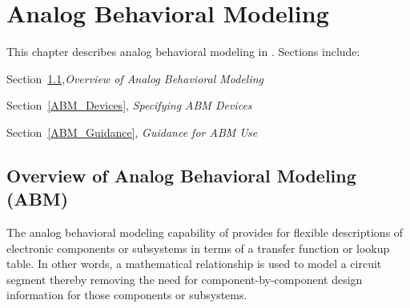 


\chapter{Analog Behavioral Modeling}
\label{Behavioral_Modeling}

{
This chapter describes analog behavioral
modeling in \Xyce{}.  Sections include:
\begin{XyceItemize}
\item Section~\ref{Behavioral_Overview},{\em Overview of Analog Behavioral Modeling}
\item Section~\ref{ABM_Devices}, {\em Specifying ABM Devices}
\item Section~\ref{ABM_Guidance}, {\em Guidance for ABM Use}
\end{XyceItemize}
}

\section{Overview of Analog Behavioral Modeling (ABM)}
\label{Behavioral_Overview}

The analog behavioral modeling
capability of \Xyce{} provides for flexible descriptions of
electronic components or subsystems in terms of a transfer function or lookup table. In other
words, a mathematical relationship is used to model a circuit segment thereby removing
the need for component-by-component design information for those components or subsystems.


